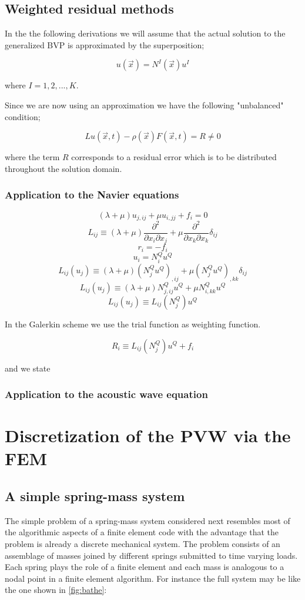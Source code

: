 \subsection{Weighted residual methods}
In the the following derivations we will assume that the actual solution to the generalized BVP is approximated by the superposition;

\[u(\vec x) = {N^I}(\vec x){u^I}\]

where $I=1,2,...,K$.

Since we are now using an approximation we have the following "unbalanced" condition;

\[Lu(\vec x,t) - \rho (\vec x)F(\vec x,t) = R \ne 0\]

where the term $R$ corresponds to a residual error which is to be distributed throughout the solution domain.



\subsubsection*{Application to the Navier equations}

\[(\lambda  + \mu ){u_{j,ij}} + \mu {u_{i,jj}} + {f_i} = 0\]
\[{L_{ij}} \equiv (\lambda  + \mu )\frac{{{\partial ^2}}}{{\partial {x_i}\partial {x_j}}} + \mu \frac{{{\partial ^2}}}{{\partial {x_k}\partial {x_k}}}{\delta _{ij}}\]
\[{r_i} =  - {f_i}\]
\[{u_i} = N_i^Q{u^Q}\]
\[{L_{ij}}({u_j}) \equiv (\lambda  + \mu ){(N_j^Q{u^Q})_{,ij}} + \mu {(N_j^Q{u^Q})_{,kk}}{\delta _{ij}}\]
\[{L_{ij}}({u_j}) \equiv (\lambda  + \mu )N_{j,ij}^Q{u^Q} + \mu N_{i,kk}^Q{u^Q}\]
\[{L_{ij}}({u_j}) \equiv {L_{ij}}(N_j^Q){u^Q}\]

In the Galerkin scheme we use the trial function as weighting function.

\[{R_i} \equiv {L_{ij}}(N_j^Q){u^Q} + {f_i}\]

and we state



\subsubsection*{Application to the acoustic wave equation}

\section[Discretization of the PVW using FEM]{Discretization of the PVW via the FEM}
\subsection*{A simple spring-mass system}
The simple problem of a spring-mass system considered next resembles most of the algorithmic aspects of a finite element code with the advantage that the problem is already a discrete mechanical system. The problem consists of an assemblage of masses joined by different springs submitted to time varying loads. Each spring plays the role of a finite element and each mass is analogous to a nodal point in a finite element algorithm. For instance the full system may be like the one shown in \cref{fig:bathe}:



